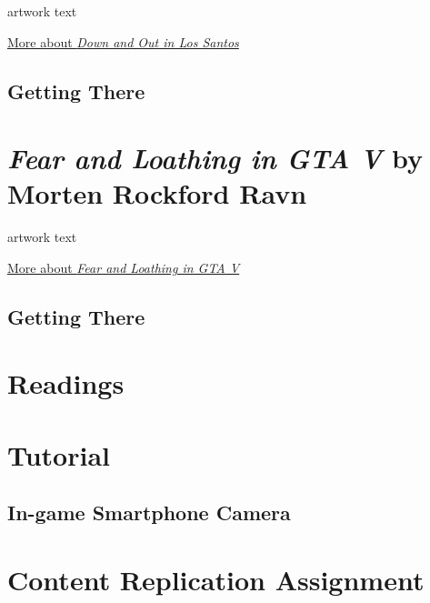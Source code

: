 \documentclass[
  openany]{book}
\begin{document}
artwork text

\href{http://www.alanbutler.info/down-and-out-in-los-santos-2016}{More about \emph{Down and Out in Los Santos}}

\hypertarget{getting-there-1}{%
\subsection{Getting There}\label{getting-there-1}}

\hypertarget{fear-and-loathing-in-gta-v-by-morten-rockford-ravn}{%
\section{\texorpdfstring{\emph{Fear and Loathing in GTA V} by Morten Rockford Ravn}{Fear and Loathing in GTA V by Morten Rockford Ravn}}\label{fear-and-loathing-in-gta-v-by-morten-rockford-ravn}}

artwork text

\href{https://fearandloathingingtav.tumblr.com/}{More about \emph{Fear and Loathing in GTA V}}

\hypertarget{getting-there-2}{%
\subsection{Getting There}\label{getting-there-2}}

\hypertarget{readings-1}{%
\section{Readings}\label{readings-1}}

\hypertarget{tutorial-1}{%
\section{Tutorial}\label{tutorial-1}}

\hypertarget{in-game-smartphone-camera}{%
\subsection{In-game Smartphone Camera}\label{in-game-smartphone-camera}}

\hypertarget{content-replication-assignment-1}{%
\section{Content Replication Assignment}\label{content-replication-assignment-1}}
\end{document}
